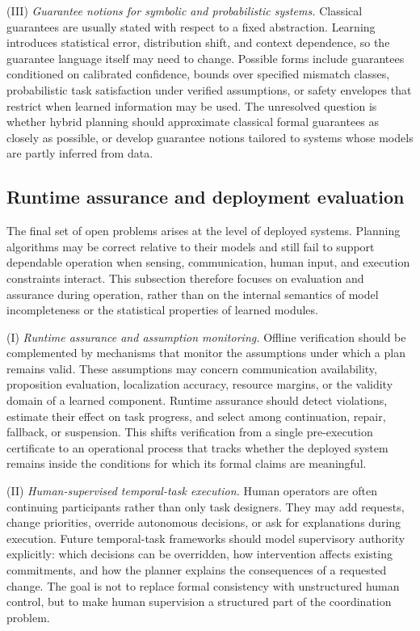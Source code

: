 (III) \emph{Guarantee notions for symbolic and probabilistic systems.}
Classical guarantees are usually stated with respect to a fixed abstraction.
Learning introduces statistical error, distribution shift, and context
dependence, so the guarantee language itself may need to change. Possible
forms include guarantees conditioned on calibrated confidence, bounds over
specified mismatch classes, probabilistic task satisfaction under verified
assumptions, or safety envelopes that restrict when learned information may be
used. The unresolved question is whether hybrid planning should approximate
classical formal guarantees as closely as possible, or develop guarantee
notions tailored to systems whose models are partly inferred from data.

\subsection{Runtime assurance and deployment evaluation}
\label{sec:ch07_deployment}

The final set of open problems arises at the level of deployed systems.
Planning algorithms may be correct relative to their models and still fail to
support dependable operation when sensing, communication, human input, and
execution constraints interact. This subsection therefore focuses on evaluation
and assurance during operation, rather than on the internal semantics of model
incompleteness or the statistical properties of learned modules.

(I) \emph{Runtime assurance and assumption monitoring.}
Offline verification should be complemented by mechanisms that monitor the
assumptions under which a plan remains valid. These assumptions may concern
communication availability, proposition evaluation, localization accuracy,
resource margins, or the validity domain of a learned component. Runtime
assurance should detect violations, estimate their effect on task progress,
and select among continuation, repair, fallback, or suspension. This shifts
verification from a single pre-execution certificate to an operational process
that tracks whether the deployed system remains inside the conditions for
which its formal claims are meaningful.

(II) \emph{Human-supervised temporal-task execution.}
Human operators are often continuing participants rather than only task
designers. They may add requests, change priorities, override autonomous
decisions, or ask for explanations during execution. Future temporal-task
frameworks should model supervisory authority explicitly: which decisions can
be overridden, how intervention affects existing commitments, and how the
planner explains the consequences of a requested change. The goal is not to
replace formal consistency with unstructured human control, but to make human
supervision a structured part of the coordination problem.

